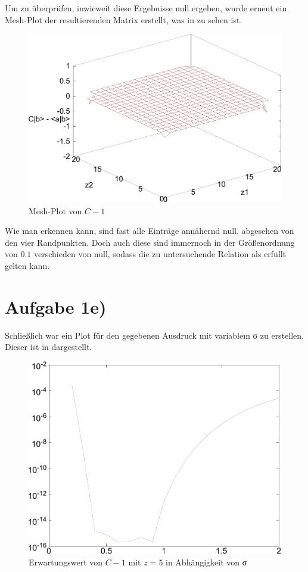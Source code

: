 Um zu überprüfen, inwieweit diese Ergebnisse null ergeben, wurde erneut ein Mesh-Plot der resultierenden
Matrix erstellt, was in  zu sehen ist.

\begin{figure}[htb]
  \centering
  \includegraphics[width=0.8\columnwidth,keepaspectratio]{../tmp/Diff-crop}
  \caption{Mesh-Plot von $C-1$}
  \label{fig:diff}
\end{figure}

Wie man erkennen kann, sind fast alle Einträge annähernd null, abgesehen von den vier Randpunkten.
Doch auch diese sind immernoch in der Größenordnung von $0.1$ verschieden von null, sodass die zu 
untersuchende Relation als erfüllt gelten kann.

\section*{Aufgabe 1e)}
Schließlich war ein Plot für den gegebenen Ausdruck mit variablem σ zu erstellen. Dieser ist in 
 dargestellt.

\begin{figure}[htb]
  \centering
  \includegraphics[width=0.8\columnwidth,keepaspectratio]{../tmp/plot-crop}
  \caption{Erwartungswert von $C-1$ mit $z=5$ in Abhängigkeit von σ}
  \label{fig:plot1e}
\end{figure}


